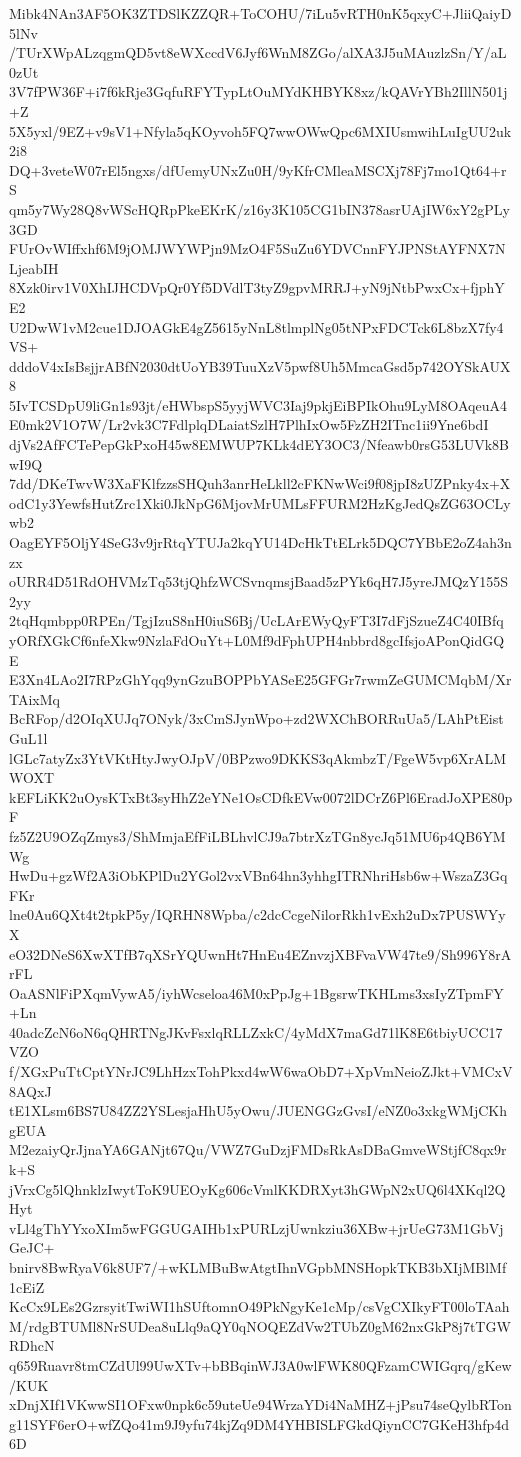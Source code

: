 Mibk4NAn3AF5OK3ZTDSlKZZQR+ToCOHU/7iLu5vRTH0nK5qxyC+JliiQaiyD5lNv
/TUrXWpALzqgmQD5vt8eWXccdV6Jyf6WnM8ZGo/alXA3J5uMAuzlzSn/Y/aL0zUt
3V7fPW36F+i7f6kRje3GqfuRFYTypLtOuMYdKHBYK8xz/kQAVrYBh2IllN501j+Z
5X5yxl/9EZ+v9sV1+Nfyla5qKOyvoh5FQ7wwOWwQpc6MXIUsmwihLuIgUU2uk2i8
DQ+3veteW07rEl5ngxs/dfUemyUNxZu0H/9yKfrCMleaMSCXj78Fj7mo1Qt64+rS
qm5y7Wy28Q8vWScHQRpPkeEKrK/z16y3K105CG1bIN378asrUAjIW6xY2gPLy3GD
FUrOvWIffxhf6M9jOMJWYWPjn9MzO4F5SuZu6YDVCnnFYJPNStAYFNX7NLjeabIH
8Xzk0irv1V0XhIJHCDVpQr0Yf5DVdlT3tyZ9gpvMRRJ+yN9jNtbPwxCx+fjphYE2
U2DwW1vM2cue1DJOAGkE4gZ5615yNnL8tlmplNg05tNPxFDCTck6L8bzX7fy4VS+
dddoV4xIsBsjjrABfN2030dtUoYB39TuuXzV5pwf8Uh5MmcaGsd5p742OYSkAUX8
5IvTCSDpU9liGn1s93jt/eHWbspS5yyjWVC3Iaj9pkjEiBPIkOhu9LyM8OAqeuA4
E0mk2V1O7W/Lr2vk3C7FdlplqDLaiatSzlH7PlhIxOw5FzZH2ITnc1ii9Yne6bdI
djVs2AfFCTePepGkPxoH45w8EMWUP7KLk4dEY3OC3/Nfeawb0rsG53LUVk8BwI9Q
7dd/DKeTwvW3XaFKlfzzsSHQuh3anrHeLkll2cFKNwWci9f08jpI8zUZPnky4x+X
odC1y3YewfsHutZrc1Xki0JkNpG6MjovMrUMLsFFURM2HzKgJedQsZG63OCLywb2
OagEYF5OljY4SeG3v9jrRtqYTUJa2kqYU14DcHkTtELrk5DQC7YBbE2oZ4ah3nzx
oURR4D51RdOHVMzTq53tjQhfzWCSvnqmsjBaad5zPYk6qH7J5yreJMQzY155S2yy
2tqHqmbpp0RPEn/TgjIzuS8nH0iuS6Bj/UcLArEWyQyFT3I7dFjSzueZ4C40IBfq
yORfXGkCf6nfeXkw9NzlaFdOuYt+L0Mf9dFphUPH4nbbrd8gcIfsjoAPonQidGQE
E3Xn4LAo2I7RPzGhYqq9ynGzuBOPPbYASeE25GFGr7rwmZeGUMCMqbM/XrTAixMq
BcRFop/d2OIqXUJq7ONyk/3xCmSJynWpo+zd2WXChBORRuUa5/LAhPtEistGuL1l
lGLc7atyZx3YtVKtHtyJwyOJpV/0BPzwo9DKKS3qAkmbzT/FgeW5vp6XrALMWOXT
kEFLiKK2uOysKTxBt3syHhZ2eYNe1OsCDfkEVw0072lDCrZ6Pl6EradJoXPE80pF
fz5Z2U9OZqZmys3/ShMmjaEfFiLBLhvlCJ9a7btrXzTGn8ycJq51MU6p4QB6YMWg
HwDu+gzWf2A3iObKPlDu2YGol2vxVBn64hn3yhhgITRNhriHsb6w+WszaZ3GqFKr
lne0Au6QXt4t2tpkP5y/IQRHN8Wpba/c2dcCcgeNilorRkh1vExh2uDx7PUSWYyX
eO32DNeS6XwXTfB7qXSrYQUwnHt7HnEu4EZnvzjXBFvaVW47te9/Sh996Y8rArFL
OaASNlFiPXqmVywA5/iyhWcseloa46M0xPpJg+1BgsrwTKHLms3xsIyZTpmFY+Ln
40adcZcN6oN6qQHRTNgJKvFsxlqRLLZxkC/4yMdX7maGd71lK8E6tbiyUCC17VZO
f/XGxPuTtCptYNrJC9LhHzxTohPkxd4wW6waObD7+XpVmNeioZJkt+VMCxV8AQxJ
tE1XLsm6BS7U84ZZ2YSLesjaHhU5yOwu/JUENGGzGvsI/eNZ0o3xkgWMjCKhgEUA
M2ezaiyQrJjnaYA6GANjt67Qu/VWZ7GuDzjFMDsRkAsDBaGmveWStjfC8qx9rk+S
jVrxCg5lQhnklzIwytToK9UEOyKg606cVmlKKDRXyt3hGWpN2xUQ6l4XKql2QHyt
vLl4gThYYxoXIm5wFGGUGAIHb1xPURLzjUwnkziu36XBw+jrUeG73M1GbVjGeJC+
bnirv8BwRyaV6k8UF7/+wKLMBuBwAtgtIhnVGpbMNSHopkTKB3bXIjMBlMf1cEiZ
KcCx9LEs2GzrsyitTwiWI1hSUftomnO49PkNgyKe1cMp/csVgCXIkyFT00loTAah
M/rdgBTUMl8NrSUDea8uLlq9aQY0qNOQEZdVw2TUbZ0gM62nxGkP8j7tTGWRDhcN
q659Ruavr8tmCZdUl99UwXTv+bBBqinWJ3A0wlFWK80QFzamCWIGqrq/gKew/KUK
xDnjXIf1VKwwSI1OFxw0npk6c59uteUe94WrzaYDi4NaMHZ+jPsu74seQylbRTon
g11SYF6erO+wfZQo41m9J9yfu74kjZq9DM4YHBISLFGkdQiynCC7GKeH3hfp4d6D
